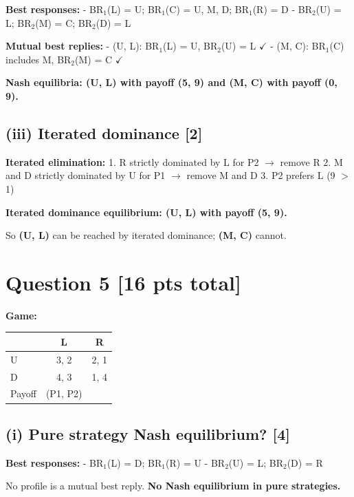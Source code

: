\documentclass[
]{article}
\newcounter{none} %
\begin{document}
\textbf{Best responses:} - BR\(_1\)(L) = U; BR\(_1\)(C) = U, M, D;
BR\(_1\)(R) = D - BR\(_2\)(U) = L; BR\(_2\)(M) = C; BR\(_2\)(D) = L

\textbf{Mutual best replies:} - (U, L): BR\(_1\)(L) = U, BR\(_2\)(U) = L
\(\checkmark\) - (M, C): BR\(_1\)(C) includes M, BR\(_2\)(M) = C
\(\checkmark\)

\textbf{Nash equilibria: (U, L) with payoff (5, 9) and (M, C) with
payoff (0, 9).}

\subsection{(iii) Iterated dominance
{[}2{]}}\label{iii-iterated-dominance-2}

\textbf{Iterated elimination:} 1. R strictly dominated by L for P2
\(\rightarrow\) remove R 2. M and D strictly dominated by U for P1
\(\rightarrow\) remove M and D 3. P2 prefers L (9 \(>\) 1)

\textbf{Iterated dominance equilibrium: (U, L) with payoff (5, 9).}

So \textbf{(U, L)} can be reached by iterated dominance; \textbf{(M, C)}
cannot.

\newpage

\section{Question 5 {[}16 pts total{]}}\label{question-5-16-pts-total}

\textbf{Game:}

{\def\LTcaptype{none} %
\begin{longtable}[]{@{}lcc@{}}
\toprule\noalign{}
& L & R \\
\midrule\noalign{}
\endhead
\bottomrule\noalign{}
\endlastfoot
U & 3, 2 & 2, 1 \\
D & 4, 3 & 1, 4 \\
Payoff & (P1, P2) & \\
\end{longtable}
}

\subsection{(i) Pure strategy Nash equilibrium?
{[}4{]}}\label{i-pure-strategy-nash-equilibrium-4}

\textbf{Best responses:} - BR\(_1\)(L) = D; BR\(_1\)(R) = U -
BR\(_2\)(U) = L; BR\(_2\)(D) = R

No profile is a mutual best reply. \textbf{No Nash equilibrium in pure
strategies.}
\end{document}
